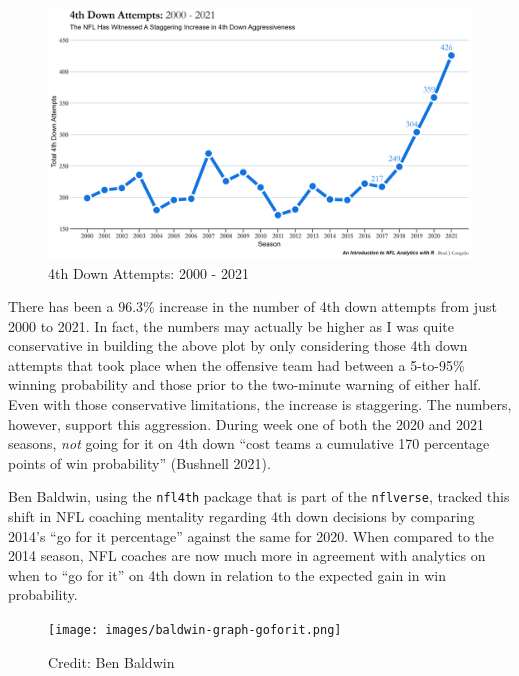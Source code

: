 \documentclass[
  letterpaper,
]{krantz}
\begin{document}
\begin{figure}

{\centering \includegraphics[width=5.25in,height=\textheight]{images/4th-down-attempts.png}

}

\caption{4th Down Attempts: 2000 - 2021}

\end{figure}

There has been a 96.3\% increase in the number of 4th down attempts from
just 2000 to 2021. In fact, the numbers may actually be higher as I was
quite conservative in building the above plot by only considering those
4th down attempts that took place when the offensive team had between a
5-to-95\% winning probability and those prior to the two-minute warning
of either half. Even with those conservative limitations, the increase
is staggering. The numbers, however, support this aggression. During
week one of both the 2020 and 2021 seasons, \emph{not} going for it on
4th down ``cost teams a cumulative 170 percentage points of win
probability'' (Bushnell 2021).

Ben Baldwin, using the \texttt{nfl4th} package that is part of the
\texttt{nflverse}, tracked this shift in NFL coaching mentality
regarding 4th down decisions by comparing 2014's ``go for it
percentage'' against the same for 2020. When compared to the 2014
season, NFL coaches are now much more in agreement with analytics on
when to ``go for it'' on 4th down in relation to the expected gain in
win probability.

\begin{figure}

{\centering \texttt{[image: images/baldwin-graph-goforit.png]}

}

\caption{Credit: Ben Baldwin}

\end{figure}
\end{document}
